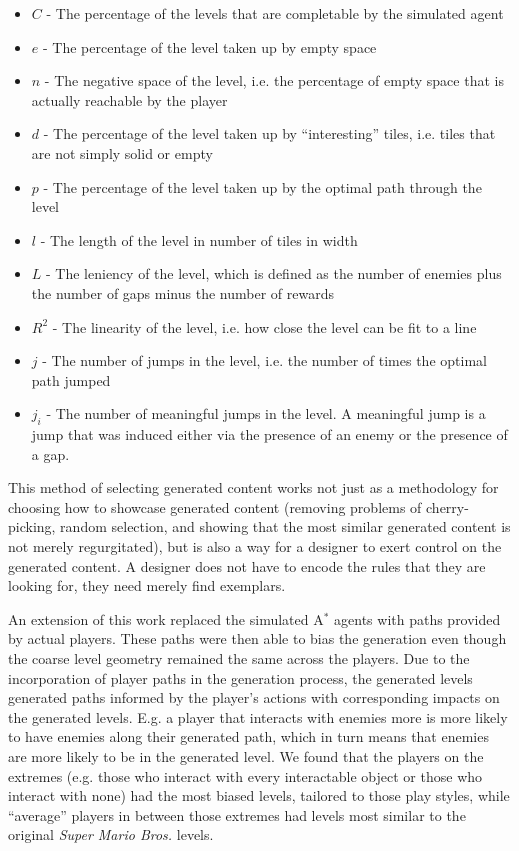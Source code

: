\documentclass[a4paper]{article}
\begin{document}
\begin{itemize}
\item $C$ - The percentage of the levels that are completable by the simulated agent
\item $e$ - The percentage of the level taken up by empty space
\item $n$ - The negative space of the level, i.e. the percentage of empty space that is actually reachable by the player
\item $d$ - The percentage of the level taken up by ``interesting'' tiles, i.e. tiles that are not simply solid or empty
\item $p$ - The percentage of the level taken up by the optimal path through the level
\item $l$ - The length of the level in number of tiles in width
\item $L$ - The leniency of the level, which is defined as the number of enemies plus the number of gaps minus the number of rewards
\item $R^2$ - The linearity of the level, i.e. how close the level can be fit to a line
\item $j$ - The number of jumps in the level, i.e. the number of times the optimal path jumped
\item $j_i$ - The number of meaningful jumps in the level.  A meaningful jump is a jump that was induced either via the presence of an enemy or the presence of a gap.
\end{itemize}

This method of selecting generated content works not just as a methodology for choosing how to showcase generated content (removing problems of cherry-picking, random selection, and showing that the most similar generated content is not merely regurgitated), but is also a way for a designer to exert control on the generated content.  A designer does not have to encode the rules that they are looking for, they need merely find exemplars.

An extension of this work replaced the simulated A$^*$ agents with paths provided by actual players.  These paths were then able to bias the generation even though the coarse level geometry remained the same across the players.  Due to the incorporation of player paths in the generation process, the generated levels generated paths informed by the player's actions with corresponding impacts on the generated levels.  E.g. a player that interacts with enemies more is more likely to have enemies along their generated path, which in turn means that enemies are more likely to be in the generated level.  We found that the players on the extremes (e.g. those who interact with every interactable object or those who interact with none) had the most biased levels, tailored to those play styles, while ``average'' players in between those extremes had levels most similar to the original \textit{Super Mario Bros.} levels.
\end{document}
